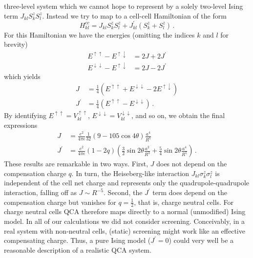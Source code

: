 three-level system which we cannot hope to represent by a solely two-level
Ising term $J_{kl} S^z_k S^z_l$. Instead we try to map to a
cell-cell Hamiltonian of the form
%
\begin{equation}
  H^{cc}_{kl} = 
  J_{kl} S^z_k S^z_l + 
  J^{\prime}_{kl} \left( S^z_k + S^z_l \right) \, .
\end{equation}
%
For this Hamiltonian we have the energies (omitting the indices $k$ and $l$ for
brevity)
%
\begin{align}
  E^{\uparrow\uparrow} - E^{\uparrow\downarrow} &= 2J + 2J^{\prime} \\
  E^{\downarrow\downarrow} - E^{\uparrow\downarrow} &= 2J - 2J^{\prime}
\end{align}
%
which yields
%
\begin{align}
  J &= \frac{1}{4} 
  \left( 
    E^{\uparrow\uparrow} + E^{\downarrow\downarrow} - 2 E^{\uparrow\downarrow} 
  \right) \\
  J^{\prime} &= \frac{1}{4}
  \left( E^{\uparrow\uparrow} - E^{\downarrow\downarrow} \right) \, .
\end{align}
%
By identifying $E^{\uparrow\uparrow} = V^{\uparrow\uparrow}_{kl}$,
$E^{\downarrow\downarrow} = V^{\downarrow\downarrow}_{kl}$, and so on, we obtain
the final expressions
%
\begin{align}
  J
  &=
  \frac{ e^2 }{ 4\pi\epsilon } \frac{ 1 }{ 32 }
  \left(
    9 - 105 \cos{4 \theta}
  \right)
  \frac{ a^4 }{ R^5 }
  \\
  J^{\prime}
  &=
  \frac{ e^2 }{ 4\pi\epsilon }
  \left( 1 - 2 q \right)
  \left(
    \frac{ 3 }{ 2 } \sin{2 \theta} \frac{ a^2 }{ R^3 } +
    \frac{ 5 }{ 4 } \sin{2 \theta} \frac{ a^4 }{ R^5 }
  \right) \, .
\end{align}
%
These results are remarkable in two ways. First, $J$ does not depend on the
compensation charge $q$. In turn, the Heiseberg-like interaction $J_{kl}
\sigma^z_k \sigma^z_l$ is independent of the cell net charge and represents only
the quadrupole-quadrupole interaction, falling off as $J \sim R^{-5}$.
Second, the $J^{\prime}$ term does depend on the compensation charge but
vanishes for $q = \frac{1}{2}$, that is, charge neutral cells. For charge
neutral cells QCA therefore maps directly to a normal (unmodified) Ising model.
In all of our calculations we did not consider screening. Conceivably, in a real
system with non-neutral cells, (static) screening might work like an effective
compensating charge. Thus, a pure Ising model ($J^{\prime} = 0$) could very well
be a reasonable description of a realistic QCA system.

